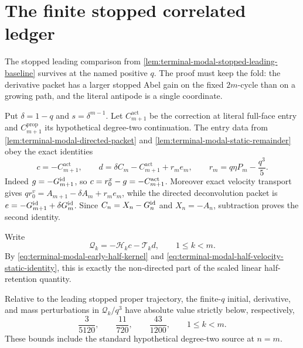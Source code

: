 \section{The finite stopped correlated ledger}
\label{sec:terminal-modal-finite-stopped-ledger}

The stopped leading comparison from
\cref{lem:terminal-modal-stopped-leading-baseline} survives at the named
positive $q$.  The proof must keep the fold: the derivative packet has a
larger stopped Abel gain on the fixed $2m$-cycle than on a growing path, and
the literal antipode is a single coordinate.

Put $\delta=1-q$ and $s=\delta^{m-1}$.  Let
$C_{m+1}^{\mathrm{act}}$ be the correction at literal full-face entry and
$C_{m+1}^{\mathrm{prop}}$ its hypothetical degree-two continuation.  The
entry data from \cref{lem:terminal-modal-directed-packet} and
\cref{lem:terminal-modal-static-remainder} obey the exact identities
\begin{equation}
 c=-C_{m+1}^{\mathrm{act}},\qquad
 d=\delta C_m-C_{m+1}^{\mathrm{act}}+r_m e_m,\qquad
 r_m=q\eta P_m-\frac{q^3}{5}.
 \label{eq:terminal-modal-finite-stopped-cd}
\end{equation}
Indeed $g=-G_{m+1}^{\rm id}$, so $c=r_0^x-g=-C_{m+1}^{\rm act}$.
Moreover exact velocity transport gives
$q r_0^v=A_{m+1}-\delta A_m+r_me_m$, while the directed
deconvolution packet is
$e=-G_{m+1}^{\rm id}+\delta G_m^{\rm id}$.  Since
$C_n=X_n-G_n^{\rm id}$ and $X_n=-A_n$, subtraction proves the second
identity.

Write
\begin{equation}
 \mathcal Q_k=-\mathcal H_kc-\mathcal T_kd,
 \qquad1\le k<m.
 \label{eq:terminal-modal-finite-stopped-Q}
\end{equation}
By \eqref{eq:terminal-modal-early-half-kernel} and
\eqref{eq:terminal-modal-half-velocity-static-identity}, this is exactly the
non-directed part of the scaled linear half-retention quantity.

\begin{lemma}
\label{lem:terminal-modal-finite-stopped-proper-perturbation}
Relative to the leading stopped proper trajectory, the finite-$q$ initial,
derivative, and mass perturbations in $\mathcal Q_k/q^3$ have absolute value
strictly below, respectively,
\begin{equation}
 \frac3{5120},\qquad \frac{11}{720},\qquad \frac{43}{1200},
 \qquad1\le k<m.
 \label{eq:terminal-modal-finite-stopped-proper-losses}
\end{equation}
These bounds include the standard hypothetical degree-two source at $n=m$.
\end{lemma}

